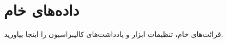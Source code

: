 \section{داده‌های خام}

قرائت‌های خام، تنظیمات ابزار و یادداشت‌های کالیبراسیون را اینجا بیاورید.

% 
